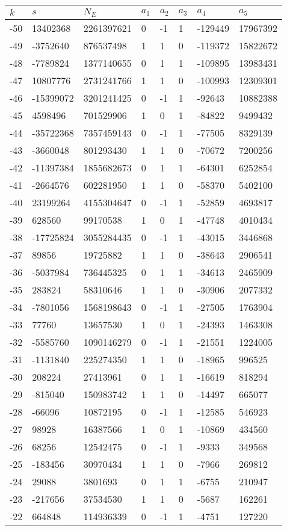 \documentclass{amsart}
\begin{document}
\begin{longtable}{|l|l|l|lllll|}
\hline
$k$ & $s$ & $N_E$ & $a_1$ & $a_2$ & $a_3$ & $a_4$ & $a_5$\\
\hline
-50&13402368&2261397621&0&-1&1&-129449&17967392\\
-49&-3752640&876537498&1&1&0&-119372&15822672\\
-48&-7789824&1377140655&0&1&1&-109895&13983431\\
-47&10807776&2731241766&1&1&0&-100993&12309301\\
-46&-15399072&3201241425&0&-1&1&-92643&10882388\\
-45&4598496&701529906&1&0&1&-84822&9499432\\
-44&-35722368&7357459143&0&-1&1&-77505&8329139\\
-43&-3660048&801293430&1&1&0&-70672&7200256\\
-42&-11397384&1855682673&0&1&1&-64301&6252854\\
-41&-2664576&602281950&1&1&0&-58370&5402100\\
-40&23199264&4155304647&0&-1&1&-52859&4693817\\
-39&628560&99170538&1&0&1&-47748&4010434\\
-38&-17725824&3055284435&0&-1&1&-43015&3446868\\
-37&89856&19725882&1&1&0&-38643&2906541\\
-36&-5037984&736445325&0&1&1&-34613&2465909\\
-35&283824&58310646&1&1&0&-30906&2077332\\
-34&-7801056&1568198643&0&-1&1&-27505&1763904\\
-33&77760&13657530&1&0&1&-24393&1463308\\
-32&-5585760&1090146279&0&-1&1&-21551&1224005\\
-31&-1131840&225274350&1&1&0&-18965&996525\\
-30&208224&27413961&0&1&1&-16619&818294\\
-29&-815040&150983742&1&1&0&-14497&665077\\
-28&-66096&10872195&0&-1&1&-12585&546923\\
-27&98928&16387566&1&0&1&-10869&434560\\
-26&68256&12542475&0&-1&1&-9333&349568\\
-25&-183456&30970434&1&1&0&-7966&269812\\
-24&29088&3801693&0&1&1&-6755&210947\\
-23&-217656&37534530&1&1&0&-5687&162261\\
-22&664848&114936339&0&-1&1&-4751&127220\\

\end{longtable}
\end{document}
